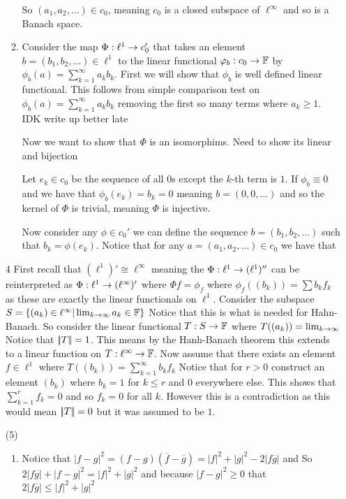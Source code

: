 \documentclass[12pt]{amsart}
\begin{document}
\begin{itemize}
\begin{enumerate}[label=(\alph*)]
    So $(a_1,a_2,\dots)\in c_0$, meaning $c_0$ is a closed 
    subspace of $\ell^\infty$ and so is a Banach space.



    \item Consider the map $\Phi:\ell^1\rightarrow c_0'$ that takes an element $b=(b_1,b_2,\dots)\in \ell^1$ to the linear functional $\varphi_b:c_0\rightarrow \mathbb{F}$ by 
    $\phi_b(a)=\sum_{k=1}^\infty a_k b_k$. First we will show that $\phi_b$ is well defined linear functional. 
    This follows from simple comparison test on $\phi_b(a)=\sum_{k=1}^\infty a_k b_k$ removing the first so many terms where $a_k\geq 1$. IDK write up better late

    Now we want to show that $\Phi$ is an isomorphims. Need to show its linear and bijection

    Let $e_k\in c_0$ be the sequence of all $0$s except the $k$-th term is $1$. 
    If $\phi_b\equiv 0$ and we have that $\phi_b(e_k)=b_k=0$ meaning $b=(0,0,\dots)$ and so the kernel of $\Phi$ is trivial, meaning $\Phi$ is injective.

    Now consider any $\phi\in c_0'$ we can define the sequence $b=(b_1,b_2,\dots)$ such that $b_k=\phi(e_k)$. 
    Notice that for any $a=(a_1,a_2,\dots)\in c_0$ we have
    that

   \end{enumerate}

   \item[4] First recall that $(\ell^1)'\cong \ell^\infty$ meaning the $\Phi:\ell^1\rightarrow (\ell^1)''$ 
   can be reinterpreted as $\Phi:\ell^1\rightarrow (\ell^\infty)'$ where $\Phi f = \phi_f$ where $\phi_f((b_k))=\sum b_k f_k$ as these are exactly the linear functionals on $\ell^1$.
   Consider the subspace $S=\{(a_k)\in\ell^\infty| \lim_{k\rightarrow\infty}a_k\in\mathbb{F}\}$ 
   Notice that this is what is needed for Hahn-Banach. So consider the linear functional
   $T:S\rightarrow\mathbb{F}$ where $T((a_k))=\lim_{k\rightarrow \infty}$ Notice that $\norm{T}=1$. This means
   by the Hanh-Banach theorem this extends to a linear function on $T:\ell^\infty\rightarrow \mathbb{F}$.
   Now assume that there exists an element $f\in\ell^1$ where $T((b_k))=\sum_{k=1}^\infty b_kf_k$
   Notice that for $r>0$ construct an element $(b_k)$ where $b_k=1$ for $k\leq r$ and $0$ everywhere else.
   This shows that $\sum_{k=1}^r f_k = 0$ and so $f_k=0$ for all $k$. However this is a contradiction as this would mean $\norm{T}=0$ but it was assumed to be $1$.
   \item[(5)] 
      \begin{enumerate}
         \item Notice that $|f-g|^2=(f-g)(\overline{f}-\overline{g})=|f|^2+|g|^2-2|f\overline{g}|$ and So
              $2|f\overline{g}|+|f-g|^2=|f|^2+|g|^2$ and because $|f-g|^2\geq 0$ that
              $2|f\overline{g}|\leq|f|^2+|g|^2$
         

\end{enumerate}
\end{itemize}
\end{document}
